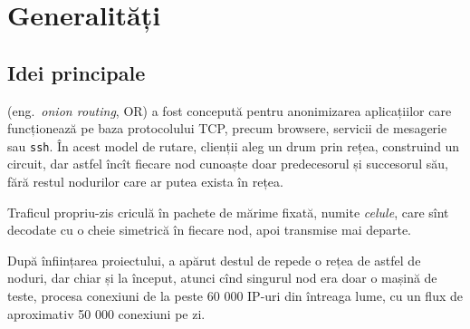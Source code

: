 
\chapter{Generalități}

\section{Idei principale}

\indent\indent {} (eng.\ \textit{onion routing}, OR) a fost
concepută pentru anonimizarea aplicațiilor care funcționează pe baza protocolului
TCP, precum browsere, servicii de mesagerie sau \texttt{ssh}. În acest model
de rutare, clienții aleg un drum prin rețea, construind un circuit, dar
astfel încît fiecare nod cunoaște doar predecesorul și succesorul său, fără restul
nodurilor care ar putea exista în rețea.

Traficul propriu-zis criculă în pachete de mărime fixată, numite \emph{celule},
 care sînt decodate cu o cheie simetrică în fiecare nod, apoi
transmise mai departe.

După înființarea proiectului, a apărut destul de repede o rețea de astfel de
noduri, dar chiar și la început, atunci cînd singurul nod era doar o mașină de teste,
procesa conexiuni de la peste 60 000 IP-uri din întreaga lume, cu un flux de
aproximativ 50 000 conexiuni pe zi.

